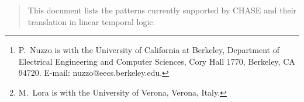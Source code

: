 \documentclass[journal]{IEEEtran}
\begin{document}
%

\author{Pierluigi~Nuzzo and Michele~Lora%
\thanks{P.~Nuzzo is with the University of California at Berkeley, Department of
Electrical Engineering and Computer Sciences,
Cory Hall 1770, Berkeley, CA 94720. E-mail:
nuzzo@eecs.berkeley.edu.}%
\thanks{M.~Lora is with the University of Verona, Verona, Italy.}
}

\maketitle

\begin{abstract}
This document lists the patterns currently supported by CHASE and their translation in linear temporal logic. 
\end{abstract}

\end{document}
